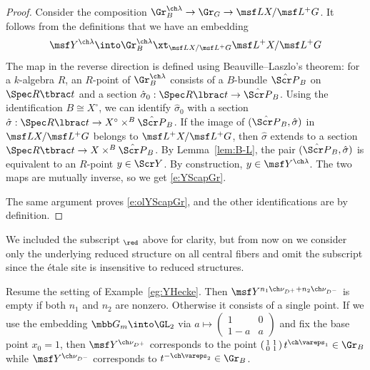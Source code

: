 \begin{proof}
Consider the composition $\Gr_B^{\ch\lambda} \to  \Gr_G \to \msf L X/\msf L^+G$.
It follows from the definitions that we have an embedding
\[  \msf Y^{\ch\lambda} \into \Gr^{\ch\lambda}_B \xt_{\msf L X/\msf L^+G} \msf L^+X/\msf L^+G
\]
The map in the reverse direction is defined using Beauville--Laszlo's theorem: for a $k$-algebra $R$, an $R$-point of $\Gr^{\ch\lambda}_B$ consists
of a $B$-bundle $\hat{\Scr P}_B$ on $\Spec R\tbrac t$ and a section
$\hat\sigma_0 : \Spec R\lbrac t \to \hat{\Scr P}_B$. Using the
identification $B \cong X^\circ$, we can identify $\hat\sigma_0$
with a section $\hat\sigma: \Spec R\lbrac t \to X^\circ \times^B \hat{\Scr P}_B$.
If the image of $(\hat{\Scr P}_B, \hat \sigma)$ in $\msf L X/\msf L^+G$ belongs to $\msf L^+X/\msf L^+G$, then
$\hat\sigma$ extends to a section $\Spec R\tbrac t \to X\times^B \hat{\Scr P}_B$.
By Lemma~\ref{lem:B-L}, the pair $(\hat{\Scr P}_B, \hat \sigma)$ is equivalent to an $R$-point $y\in \Scr Y$.
By construction, $y\in \msf Y^{\ch\lambda}$.
The two maps are mutually inverse, so we get \eqref{e:YScapGr}.

The same argument proves \eqref{e:olYScapGr},
and the other identifications are by definition.
\end{proof}

We included the subscript $_\red$ above for clarity, but from now on we
consider only the underlying reduced structure on all central fibers
and omit the subscript since the \'etale site is insensitive
to reduced structures.

\begin{eg}
\notready \label{eg:Yfiber}
Resume the setting of Example~\ref{eg:YHecke}.
Then $\msf Y^{n_1 \ch\nu_{D^+} + n_2 \ch\nu_{D^-}}$ is empty if both $n_1$ and $n_2$ are nonzero.
Otherwise it consists of a single point.
 If we use the embedding $\mbb G_m \into \GL_2$
via $a\mapsto \left( \begin{smallmatrix} 1 & 0 \\ 1-a& a \end{smallmatrix}\right)$
and fix the base point $x_0=1$, then $\msf Y^{\ch\nu_{D^+}}$
corresponds to the point
$\left( \begin{smallmatrix} 1 & 1 \\ 0 & 1 \end{smallmatrix} \right) t^{\ch\vareps_1} \in \Gr_B$
while $\msf Y^{\ch\nu_{D^-}}$ corresponds to $t^{-\ch\vareps_2} \in \Gr_B$.
\end{eg}


